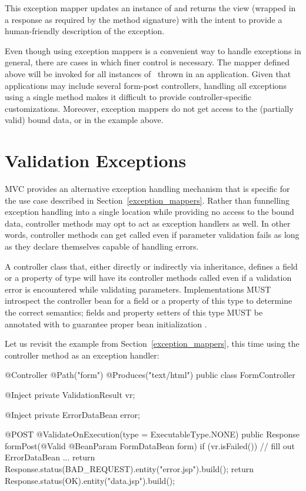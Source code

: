 This exception mapper updates an instance of  and returns 
the  view 
(wrapped in a response as required by the method signature) with the intent to provide a 
human-friendly description of the exception.

Even though using exception mappers is a convenient way to handle exceptions in general, 
there are cases in which finer control is necessary. The mapper defined above will be
invoked for all instances of \ConstVioExc\ thrown in an application. Given that 
applications may include several form-post controllers, handling all exceptions using
a single method makes it difficult to provide controller-specific customizations.
Moreover, exception mappers do not get access to the (partially valid) bound
data, or  in the example above.

\section{Validation Exceptions}
\label{validation_exceptions}

MVC provides an alternative exception handling mechanism that is specific for the 
use case described in Section~\ref{exception_mappers}. Rather than funnelling 
exception handling into a single location while providing no access to the bound
data, controller methods may opt to act as exception handlers as well. In other words, 
controller methods can get called even if parameter validation fails as long as
they declare themselves capable of handling errors.

A controller class that, either directly or indirectly via inheritance, defines 
a field or a property of type 
 will have its controller methods
called even if a validation error is encountered while validating parameters. 
Implementations MUST introspect the controller bean for a field or a property of
this type to determine the correct semantics; fields and property setters
of this type MUST be annotated with  to guarantee proper bean
initialization .

Let us revisit the example from Section~\ref{exception_mappers},
this time using the controller method as an exception handler:

\begin{listing}{1}
@Controller
@Path("form")
@Produces("text/html")
public class FormController {

    @Inject
    private ValidationResult vr;
    
    @Inject
    private ErrorDataBean error;

    @POST
    @ValidateOnExecution(type = ExecutableType.NONE)
    public Response formPost(@Valid @BeanParam FormDataBean form) {
        if (vr.isFailed()) {
            // fill out ErrorDataBean ...
            return Response.status(BAD_REQUEST).entity("error.jsp").build();
        }
        return Response.status(OK).entity("data.jsp").build();    
    }
}
\end{listing}

